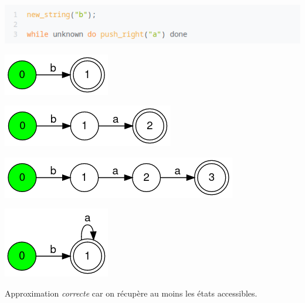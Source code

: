 \documentclass{beamer}
\begin{document}
\begin{frame}
  \begin{center}
  \includegraphics[width=0.8\linewidth]{ while0 }
    \begin{minipage}{0.48\linewidth}
      \includegraphics[width=0.45\linewidth]{ while1 }
    \end{minipage}
    \hfill
    \begin{minipage}{0.49\linewidth}
      \includegraphics[width=0.7\linewidth]{ while2 }
    \end{minipage}

    \begin{minipage}{0.48\linewidth}
      \includegraphics[width=0.9\linewidth]{ while3 }
    \end{minipage}
    \hfill
    \begin{minipage}{0.48\linewidth}
      \includegraphics[width=0.45\linewidth]{ while4 }
    \end{minipage}
    Approximation \emph{correcte} car on récupère au moins les états accessibles.
  \end{center}
\end{frame}
\end{document}
